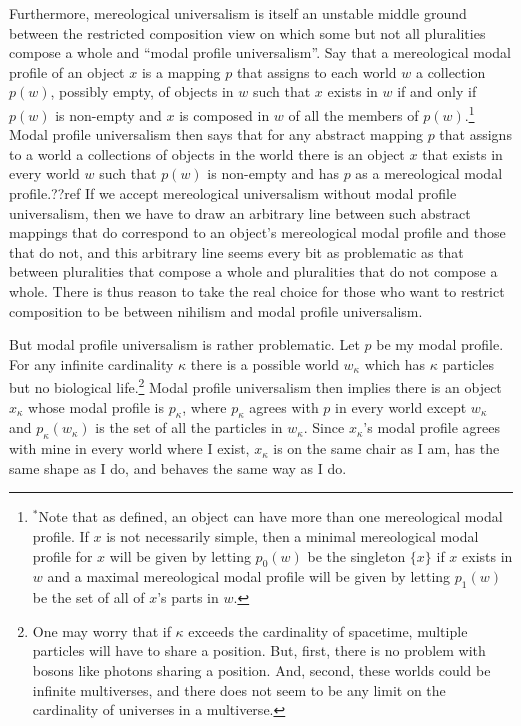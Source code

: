 Furthermore, mereological universalism is itself an unstable middle ground between 
the restricted composition view on which some but not all pluralities compose a whole
and ``modal profile universalism''. Say that a mereological modal profile of an object $x$ 
is a mapping $p$ that assigns to each world $w$ a collection $p(w)$, possibly empty, of 
objects in $w$ such that $x$ exists in $w$ if and only if $p(w)$ is non-empty and $x$
is composed in $w$ of all the members of $p(w)$.\footnote{$^*$Note that as defined, an object
can have more than one mereological modal profile. If $x$ is not necessarily simple, then
a minimal mereological modal profile for $x$ will be given by letting $p_0(w)$ be the singleton
$\{ x \}$ if $x$ exists in $w$ and a maximal mereological modal profile will be given by 
letting $p_1(w)$ be the set of all of $x$'s parts in $w$.}
Modal profile universalism then says that for any abstract mapping $p$ that assigns to a world
a collections of objects in the world there is an object $x$ that exists in every world $w$ such that
$p(w)$ is non-empty and has $p$ as a mereological modal profile.??ref If we accept mereological
universalism without modal profile universalism, then we have to draw an arbitrary line between
such abstract mappings that do correspond to an object's mereological modal profile and those that
do not, and this arbitrary line seems every bit as problematic as that between pluralities that
compose a whole and pluralities that do not compose a whole. There is thus reason to take the
real choice for those who want to restrict composition to be between nihilism and modal profile
universalism.

But modal profile universalism is rather problematic. Let $p$ be my modal profile. For any infinite
cardinality $\kappa$ there is a possible world $w_\kappa$ which has $\kappa$ particles but no 
biological life.\footnote{One may worry that if $\kappa$ exceeds the cardinality of
spacetime, multiple particles will have to share a position. But, first, there is no problem with
bosons like photons sharing a position. And, second, these worlds could be infinite multiverses, and
there does not seem to be any limit on the cardinality of universes in a multiverse.} Modal
profile universalism then implies there is an object $x_\kappa$ whose modal profile is $p_\kappa$, where
$p_\kappa$ agrees with $p$ in every world except $w_\kappa$ and $p_\kappa(w_\kappa)$ is the set of
all the particles in $w_\kappa$. Since $x_\kappa$'s modal profile agrees with mine in every world
where I exist, $x_\kappa$ is on the same chair as I am, has the same shape as I do, and behaves the
same way as I do. 


